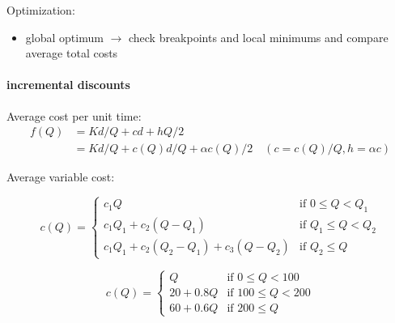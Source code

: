 \begin{question}
\begin{solution}
Optimization:
\begin{itemize}
\item global optimum $\rightarrow$ check breakpoints and local minimums and compare average total costs
\end{itemize}


\paragraph{incremental discounts}

\begin{center}
\end{center}

Average cost per unit time:
\begin{align*}
f(Q) 
& = Kd / Q + cd + hQ / 2 \\
& = Kd / Q + c(Q)d/Q + \alpha c(Q)/2 \quad (c = c(Q)/Q, h = \alpha c)
\end{align*}

Average variable cost:

\begin{equation*}
c(Q) = 
\begin{cases}
c_1 Q & \text{if } 0 \leq Q < Q_1 \\
c_1 Q_1 + c_2(Q - Q_1) & \text{if } Q_1 \leq Q < Q_2 \\
c_1 Q_1 + c_2(Q_2 - Q_1) + c_3(Q - Q_2) & \text{if } Q_2 \leq Q 
\end{cases}
\end{equation*}


\begin{equation*}
c(Q) = 
\begin{cases}
Q & \text{if } 0 \leq Q < 100 \\
20 + 0.8Q & \text{if } 100 \leq Q < 200 \\
60 + 0.6Q & \text{if } 200 \leq Q 
\end{cases}
\end{equation*}


\end{solution}
\end{question}
